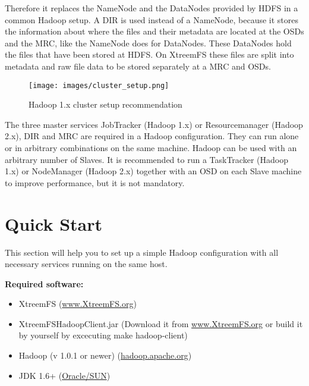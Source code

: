 \documentclass[a4paper,10pt]{book}
\begin{document}
Therefore it replaces the NameNode and the DataNodes provided by HDFS in a common Hadoop setup. A DIR is used instead of a NameNode, because it stores the information about where the files and their metadata are located at the OSDs and the MRC, like the NameNode does for DataNodes. These DataNodes hold the files that have been stored at HDFS. On XtreemFS these files are split into metadata and raw file data to be stored separately at a MRC and OSDs.

\begin{figure}[h]
 \centering
 \texttt{[image: images/cluster\_setup.png]}
 \caption{Hadoop 1.x cluster setup recommendation}
 \label{fig:cluster_setup}
\end{figure}

The three master services JobTracker (Hadoop 1.x) or Resourcemanager (Hadoop 2.x), DIR and MRC are required in a Hadoop configuration. They can run alone or in arbitrary combinations on the same machine. Hadoop can be used with an arbitrary number of Slaves. It is recommended to run a TaskTracker (Hadoop 1.x) or NodeManager (Hadoop 2.x) together with an OSD on each Slave machine to improve performance, but it is not mandatory.

\section{Quick Start}
\label{sec:hadoop_quickstart}

This section will help you to set up a simple Hadoop configuration with all necessary services running on the same host.

\textbf{Required software:}
\begin{itemize}
\item XtreemFS (\href{http://xtreemfs.org/download.php?t=source}{www.XtreemFS.org})
\item XtreemFSHadoopClient.jar (Download it from \href{http://www.xtreemfs.org/downloads/XtreemFSHadoopClient.jar}{www.XtreemFS.org} or build it by yourself by excecuting make hadoop-client)
\item Hadoop (v 1.0.1 or newer) (\href{http://hadoop.apache.org}{hadoop.apache.org})
\item JDK 1.6+ (\href{http://java.sun.com}{Oracle/SUN})
\end{itemize}
\end{document}

